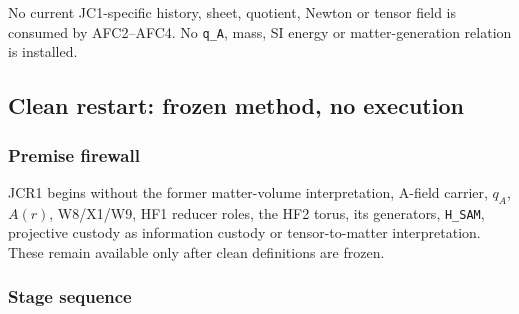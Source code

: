 No current JC1-specific history, sheet, quotient, Newton or tensor field
is consumed by AFC2--AFC4. No \texttt{q\_A}, mass, SI energy or
matter-generation relation is installed.

\subsection{Clean restart: frozen method, no
execution}\label{viii-ch11-clean-restart-frozen-method-no-execution}

\subsubsection{Premise firewall}\label{viii-ch11-premise-firewall}

JCR1 begins without the former matter-volume interpretation, A-field
carrier, \(q_A\), \(A(r)\), W8/X1/W9, HF1 reducer roles, the HF2 torus,
its generators, \texttt{H\_SAM}, projective custody as information
custody or tensor-to-matter interpretation. These remain available only
after clean definitions are frozen.

\subsubsection{Stage sequence}\label{viii-ch11-stage-sequence}

